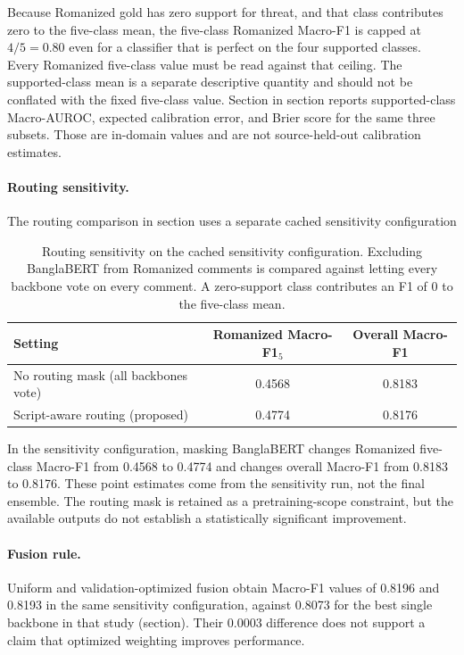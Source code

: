 \documentclass[11pt,a4paper]{article}
\def\Cref#1{Section}%
\def\cref#1{section}%
\def\emph#1{#1}%
\begin{document}
Because Romanized gold has zero support for \emph{threat}, and that class contributes zero to the five-class mean, the five-class Romanized Macro-F1 is capped at $4/5 = 0.80$ even for a classifier that is perfect on the four supported classes. Every Romanized five-class value must be read against that ceiling. The supported-class mean is a separate descriptive quantity and should not be conflated with the fixed five-class value. \Cref{tab:calibration} in \cref{sec:appendix} reports supported-class Macro-AUROC, expected calibration error, and Brier score for the same three subsets. Those are in-domain values and are not source-held-out calibration estimates.

\paragraph{Routing sensitivity.} The routing comparison in \cref{tab:scriptmask} uses a separate cached sensitivity configuration

\begin{table}[!htbp]
\centering
\caption{Routing sensitivity on the cached sensitivity configuration. Excluding BanglaBERT from Romanized comments is compared against letting every backbone vote on every comment. A zero-support class contributes an F1 of $0$ to the five-class mean.}
\label{tab:scriptmask}
\small
\begin{tabular}{@{}lcc@{}}
\toprule
\textbf{Setting} & \textbf{Romanized Macro-F1$_5$} & \textbf{Overall Macro-F1} \\
\midrule
No routing mask (all backbones vote) & 0.4568 & 0.8183 \\
Script-aware routing (proposed) & 0.4774 & 0.8176 \\
\bottomrule
\end{tabular}
\end{table}

In the sensitivity configuration, masking BanglaBERT changes Romanized five-class Macro-F1 from 0.4568 to 0.4774 and changes overall Macro-F1 from 0.8183 to 0.8176. These point estimates come from the sensitivity run, not the final ensemble. The routing mask is retained as a pretraining-scope constraint, but the available outputs do not establish a statistically significant improvement.

\paragraph{Fusion rule.} Uniform and validation-optimized fusion obtain Macro-F1 values of 0.8196 and 0.8193 in the same sensitivity configuration, against 0.8073 for the best single backbone in that study (\cref{tab:fusion}). Their 0.0003 difference does not support a claim that optimized weighting improves performance.
\end{document}
